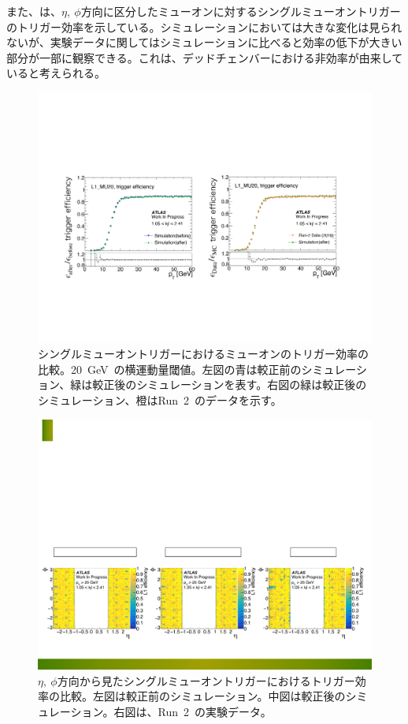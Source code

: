 また、は、$\eta,~\phi$方向に区分したミューオンに対するシングルミューオントリガーのトリガー効率を示している。シミュレーションにおいては大きな変化は見られないが、実験データに関してはシミュレーションに比べると効率の低下が大きい部分が一部に観察できる。これは、デッドチェンバーにおける非効率が由来していると考えられる。
\begin{figure}[H]
        \centering   
        \includegraphics[width=\textwidth,page=1]{img/rec/trig.pdf}
        \caption[シングルミューオントリガーにおけるミューオンのトリガー効率の比較]{シングルミューオントリガーにおけるミューオンのトリガー効率の比較。20~GeV~の横運動量閾値。左図の青は較正前のシミュレーション、緑は較正後のシミュレーションを表す。右図の緑は較正後のシミュレーション、橙はRun~2~のデータを示す。}\label{fig:singletri}
\end{figure}

\begin{figure}[H]
        \centering   
        \includegraphics[width=\textwidth,page=1]{img/rec/tri1.pdf}
        \caption[$\eta, \phi$方向から見たシングルミューオントリガーにおけるトリガー効率の比較]{$\eta,~\phi$方向から見たシングルミューオントリガーにおけるトリガー効率の比較。左図は較正前のシミュレーション。中図は較正後のシミュレーション。右図は、Run~2~の実験データ。}\label{fig:singletriep}
\end{figure}

